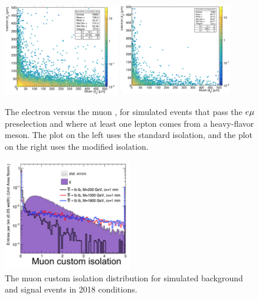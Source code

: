 \begin{figure}
\centering
\includegraphics[width=0.45\textwidth]{figures/selection/StandardIso_ElectronD0vsMuonD0_2018emuTTbar.png}
\includegraphics[width=0.44\textwidth]{figures/selection/CustomIso_ElectronD0vsMuonD0_2018emuTTbar.png}
\caption{The electron \ad versus the muon \ad, for \ttbar simulated events that pass the $e{\mu}$ preselection and where at least one lepton comes from a heavy-flavor meson. The plot on the left uses the standard isolation, and the plot on the right uses the modified isolation.}
\label{iso_performance_comparison}
\end{figure}

\begin{figure}
\centering
\includegraphics[width=0.5\textwidth]{figures/selection/MuonCustomIso_TTbar_Signal.png}
\caption{The muon custom isolation distribution for simulated \ttbar background and \stoptolb signal events in 2018 conditions.}
\label{iso_signal_bg}
\end{figure}